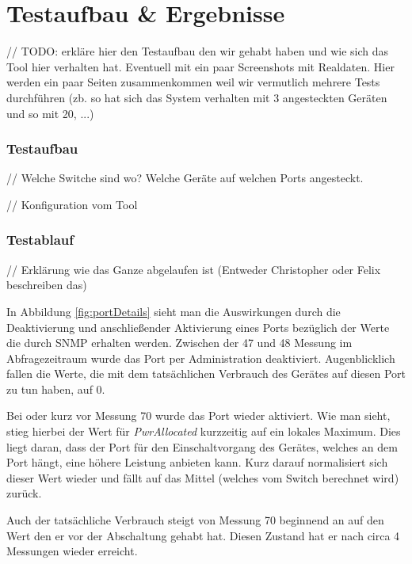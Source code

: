 \section{Testaufbau \& Ergebnisse}
\label{sec:test}

// TODO: erkläre hier den Testaufbau den wir gehabt haben und wie sich das Tool hier verhalten hat. Eventuell mit ein paar Screenshots mit Realdaten. Hier werden ein paar Seiten zusammenkommen weil wir vermutlich mehrere Tests durchführen (zb. so hat sich das System verhalten mit 3 angesteckten Geräten und so mit 20, ...)

\subsubsection{Testaufbau}
// Welche Switche sind wo? Welche Geräte auf welchen Ports angesteckt.

// Konfiguration vom Tool

\subsubsection{Testablauf}

// Erklärung wie das Ganze abgelaufen ist (Entweder Christopher oder Felix beschreiben das)

In Abbildung \ref{fig:portDetails} sieht man die Auswirkungen durch die Deaktivierung und anschließender Aktivierung eines Ports bezüglich der Werte die durch SNMP erhalten werden. Zwischen der 47 und 48 Messung im Abfragezeitraum wurde das Port per Administration deaktiviert. Augenblicklich fallen die Werte, die mit dem tatsächlichen Verbrauch des Gerätes auf diesen Port zu tun haben, auf 0. 

Bei oder kurz vor Messung 70 wurde das Port wieder aktiviert. Wie man sieht, stieg hierbei der Wert für \textit{PwrAllocated} kurzzeitig auf ein lokales Maximum. Dies liegt daran, dass der Port für den Einschaltvorgang des Gerätes, welches an dem Port hängt, eine höhere Leistung anbieten kann. Kurz darauf normalisiert sich dieser Wert wieder und fällt auf das Mittel (welches vom Switch berechnet wird) zurück.

Auch der tatsächliche Verbrauch steigt von Messung 70 beginnend an auf den Wert den er vor der Abschaltung gehabt hat. Diesen Zustand hat er nach circa 4 Messungen wieder erreicht.

